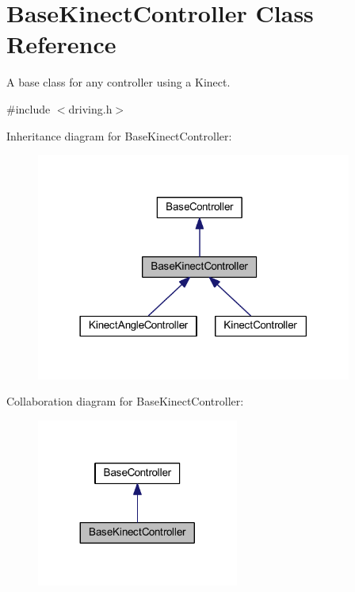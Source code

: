 \hypertarget{class_base_kinect_controller}{\section{\-Base\-Kinect\-Controller \-Class \-Reference}
\label{class_base_kinect_controller}
}


\-A base class for any controller using a \-Kinect.  




{\ttfamily \#include $<$driving.\-h$>$}



\-Inheritance diagram for \-Base\-Kinect\-Controller\-:\nopagebreak
\begin{figure}[H]
\begin{center}
\leavevmode
\includegraphics[width=294pt]{class_base_kinect_controller__inherit__graph}
\end{center}
\end{figure}


\-Collaboration diagram for \-Base\-Kinect\-Controller\-:\nopagebreak
\begin{figure}[H]
\begin{center}
\leavevmode
\includegraphics[width=188pt]{class_base_kinect_controller__coll__graph}
\end{center}
\end{figure}
